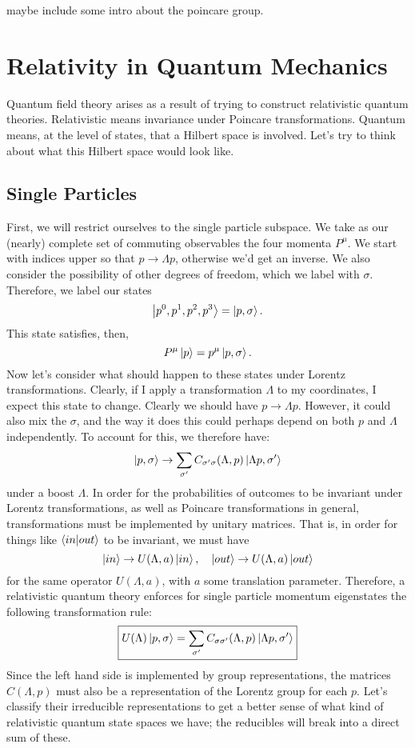 \documentclass[main.tex]{subfiles}
\begin{document}
maybe include some intro about the poincare group.

\chapter{Relativity in Quantum Mechanics}

Quantum field theory arises as a result of trying to construct relativistic quantum theories. Relativistic means invariance under Poincare transformations. Quantum means, at the level of states, that a Hilbert space is involved. Let's try to think about what this Hilbert space would look like. 

\section{Single Particles}
First, we will restrict ourselves to the single particle subspace. We take as our (nearly) complete set of commuting observables the four momenta $P^\mu$. We start with indices upper so that $p \to \Lambda p$, otherwise we'd get an inverse. We also consider the possibility of other degrees of freedom, which we label with $\sigma$. Therefore, we label our states
\[
\ket{p^0,p^1,p^2,p^3} = \ket{p,\sigma}.
\]
This state satisfies, then,
\[
P^\mu \ket{p} = p^\mu \ket{p,\sigma}.
\]
Now let's consider what should happen to these states under Lorentz transformations. Clearly, if I apply a transformation $\Lambda$ to my coordinates, I expect this state to change. Clearly we should have $p \to \Lambda p$. However, it could also mix the $\sigma$, and the way it does this could perhaps depend on both $p$ and $\Lambda$ independently. To account for this, we therefore have:
\[
\ket{p,\sigma} \to \sum_{\sigma'} C_{\sigma' \sigma} (\Lambda,p) \ket{\Lambda p,\sigma'}
\]
under a boost $\Lambda$. In order for the probabilities of outcomes to be invariant under Lorentz transformations, as well as Poincare transformations in general, transformations must be implemented by unitary matrices. That is, in order for things like $\bra{in}\ket{out}$ to be invariant, we must have
\[
\ket{in} \to U(\Lambda,a) \ket{in}, \quad \ket{out} \to U(\Lambda,a) \ket{out}
\]
for the same operator $U(\Lambda,a)$, with $a$ some translation parameter.  Therefore, a relativistic quantum theory enforces for single particle momentum eigenstates the following transformation rule:
\begin{equation} \label{eq:qmrelstate} 
\boxed{U(\Lambda) \ket{p,\sigma} = \sum_{\sigma'} C_{\sigma \sigma'} (\Lambda,p) \ket{\Lambda p, \sigma'}}
\end{equation}
Since the left hand side is implemented by group representations, the matrices $C(\Lambda,p)$ must also be a representation of the Lorentz group for each $p$. Let's classify their irreducible representations to get a better sense of what kind of relativistic quantum state spaces we have; the reducibles will break into a direct sum of these.
\end{document}
